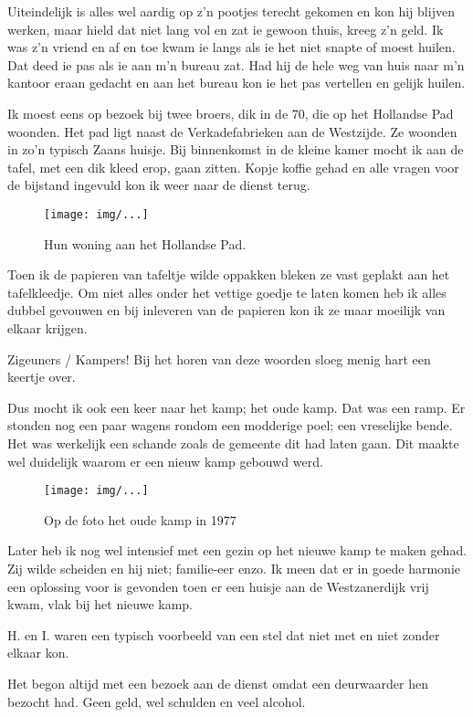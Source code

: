 \documentclass[10pt,twoside,openright]{memoir}
\begin{document}
Uiteindelijk is alles wel aardig op z’n pootjes terecht gekomen en kon hij blijven werken, maar hield dat niet lang vol en zat ie gewoon thuis, kreeg z’n geld. Ik was z’n vriend en af en toe kwam ie langs als ie het niet snapte of moest huilen. Dat deed ie pas als ie aan m’n bureau zat. Had hij de hele weg van huis naar m’n kantoor eraan gedacht en aan het bureau kon ie het pas vertellen en gelijk huilen.

Ik moest eens op bezoek bij twee broers, dik in de 70, die op het Hollandse Pad woonden. Het pad ligt naast de Verkadefabrieken aan de Westzijde. Ze woonden in zo’n typisch Zaans huisje. Bij binnenkomst in de kleine kamer mocht ik aan de tafel, met een dik kleed erop, gaan zitten. Kopje koffie gehad en alle vragen voor de bijstand ingevuld kon ik weer naar de dienst terug. 

\begin{figure}[t]
\texttt{[image: img/...]}
\caption{Hun woning aan het Hollandse Pad.}
\end{figure}

Toen ik de papieren van tafeltje wilde oppakken bleken ze vast geplakt aan het tafelkleedje. Om niet alles onder het vettige goedje te laten komen heb ik alles dubbel gevouwen en bij inleveren van de papieren kon ik ze maar moeilijk van elkaar krijgen.	

Zigeuners / Kampers! Bij het horen van deze woorden sloeg menig hart een keertje over. 

Dus mocht ik ook een keer naar het kamp; het oude kamp. Dat was een ramp. Er stonden nog een paar wagens rondom een modderige poel; een vreselijke bende. Het was werkelijk een schande zoals de gemeente dit had laten gaan. Dit maakte wel duidelijk waarom er een nieuw kamp gebouwd werd. 

\begin{figure}[t]
\texttt{[image: img/...]}
\caption{Op de foto het oude kamp in 1977}
\end{figure}

Later heb ik nog wel intensief met een gezin op het nieuwe kamp te maken gehad. Zij wilde scheiden en hij niet; familie-eer enzo. Ik meen dat er in goede harmonie een oplossing voor is gevonden toen er een huisje aan de Westzanerdijk vrij kwam, vlak bij het nieuwe kamp. 

H. en I. waren een typisch voorbeeld van een stel dat niet met en niet zonder elkaar kon. 

Het begon altijd met een bezoek aan de dienst omdat een deurwaarder hen bezocht had. Geen geld, wel schulden en veel alcohol.
\end{document}
